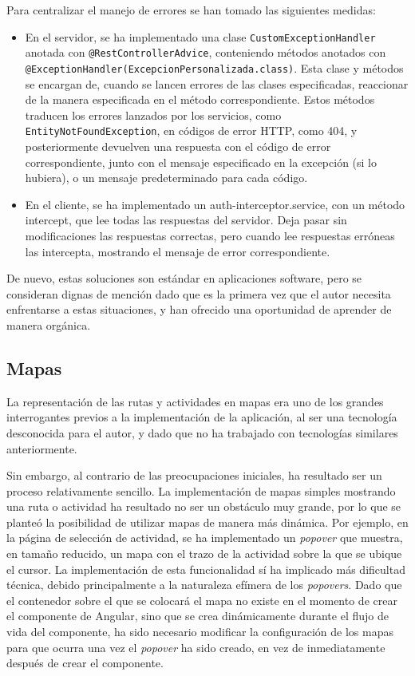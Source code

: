 \noindent Para centralizar el manejo de errores se han tomado las siguientes medidas:
\begin{itemize}
    \item En el servidor, se ha implementado una clase \texttt{CustomExceptionHandler} anotada con \texttt{@RestControllerAdvice}, conteniendo métodos anotados con \texttt{@ExceptionHandler(ExcepcionPersonalizada.class)}. Esta clase y métodos se encargan de, cuando se lancen errores de las clases especificadas, reaccionar de la manera especificada en el método correspondiente. Estos métodos traducen los errores lanzados por los servicios, como \texttt{EntityNotFoundException}, en códigos de error HTTP, como 404, y posteriormente devuelven una respuesta con el código de error correspondiente, junto con el mensaje especificado en la excepción (si lo hubiera), o un mensaje predeterminado para cada código.
    \item En el cliente, se ha implementado un auth-interceptor.service, con un método intercept, que lee todas las respuestas del servidor. Deja pasar sin modificaciones las respuestas correctas, pero cuando lee respuestas erróneas las intercepta, mostrando el mensaje de error correspondiente.
\end{itemize}
De nuevo, estas soluciones son estándar en aplicaciones software, pero se consideran dignas de mención dado que es la primera vez que el autor necesita enfrentarse a estas situaciones, y han ofrecido una oportunidad de aprender de manera orgánica.

\subsection{Mapas}
La representación de las rutas y actividades en mapas era uno de los grandes interrogantes previos a la implementación de la aplicación, al ser una tecnología desconocida para el autor, y dado que no ha trabajado con tecnologías similares anteriormente.

Sin embargo, al contrario de las preocupaciones iniciales, ha resultado ser un proceso relativamente sencillo. La implementación de mapas simples mostrando una ruta o actividad ha resultado no ser un obstáculo muy grande, por lo que se planteó la posibilidad de utilizar mapas de manera más dinámica. Por ejemplo, en la página de selección de actividad, se ha implementado un \textit{popover} que muestra, en tamaño reducido, un mapa con el trazo de la actividad sobre la que se ubique el cursor. La implementación de esta funcionalidad sí ha implicado más dificultad técnica, debido principalmente a la naturaleza efímera de los \textit{popovers}. Dado que el contenedor sobre el que se colocará el mapa no existe en el momento de crear el componente de Angular, sino que se crea dinámicamente durante el flujo de vida del componente, ha sido necesario modificar la configuración de los mapas para que ocurra una vez el \textit{popover} ha sido creado, en vez de inmediatamente después de crear el componente.

